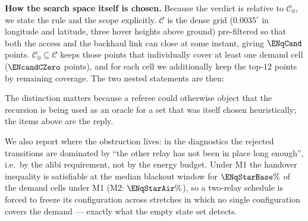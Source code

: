 \documentclass[11pt]{article}
\makeatletter
\def\dsh@tt#1{\dsh@ttloop#1\dsh@end}
\def\dsh@ttloop#1{\ifx#1\dsh@end\else\dsh@ttemit{#1}\expandafter\dsh@ttloop\fi}
\def\dsh@ttemit#1{#1\penalty\z@\hskip\z@ plus 0.02em\relax}
\renewcommand{\texttt}[1]{{\ttfamily\hyphenchar\font=-1 \dsh@tt{#1}}}
\theoremstyle{dshplain}
\theoremstyle{dshdefn}
\makeatother
\begin{document}
\noindent\textbf{How the search space itself is chosen.} Because the verdict is
relative to $\mathcal{C}_0$, we state the rule and the scope explicitly.
$\mathcal{C}$ is the dense grid ($0.0035^\circ$ in longitude and latitude,
three hover heights above ground) pre-filtered so that both the access and the
backhaul link can close at some instant, giving $\ENqCand$ points.
$\mathcal{C}_0\subseteq\mathcal{C}$ keeps those points that individually cover at
least one demand cell ($\ENcandCZero$ points), and for each cell we additionally
keep the top-$12$ points by remaining coverage. The two nested statements are
then:
The distinction matters because a referee could otherwise object that the
recursion is being used as an oracle for a set that was itself chosen
heuristically; the items above are the reply.

\noindent We also report where the obstruction lives: in the diagnostics the
rejected transitions are dominated by ``the other relay has not been in place
long enough'', i.e.\ by the alibi requirement, not by the energy budget. Under M1
the handover inequality is satisfiable at the median blackout window for
$\ENqStarBase\%$ of the demand cells under M1 (M2: $\ENqStarAir\%$), so a
two-relay schedule is forced to freeze its
configuration across stretches in which no single configuration covers the
demand --- exactly what the empty state set detects.
\end{document}
